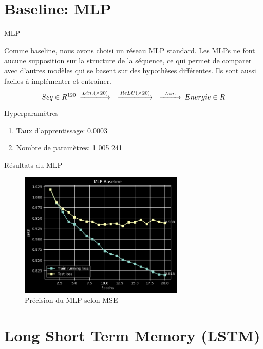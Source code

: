 \documentclass{beamer}
\begin{document}
\section{Baseline: MLP}
\begin{frame}{MLP}

Comme baseline, nous avons choisi un réseau MLP standard. Les MLPs ne font aucune supposition sur la structure de la séquence, ce qui permet de comparer avec d'autres modèles qui se basent sur des hypothèses différentes. Ils sont aussi faciles à implémenter et entraîner. 
\begin{equation*}
    \begin{CD}
        @. Seq \in R^{120}
        @>Lin. (\times 20)>> 
        @>ReLU (\times 20)>> 
        @>Lin.>> 
        Energie \in R
    \end{CD}
\end{equation*}

\begin{block}{Hyperparamètres}
\begin{enumerate}
    \item Taux d'apprentissage: 0.0003
    \item Nombre de paramètres: 1 005 241
\end{enumerate}
\end{block}

\end{frame}


\begin{frame}{Résultats du MLP}
\begin{figure} \label{fig:mlp}
    \caption{Précision du MLP selon MSE} \center
    \includegraphics[width=0.7\textwidth]{images/mlp.png}
\end{figure}
\end{frame}


\section{Long Short Term Memory (LSTM)}
\end{document}
